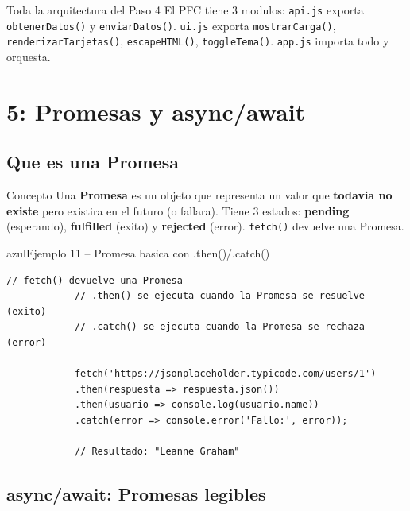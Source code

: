 \documentclass[11pt,a4paper]{article}
\begin{document}
	\begin{cajapractica}{Toda la arquitectura del Paso 4}
		El PFC tiene 3 modulos: \texttt{api.js} exporta \texttt{obtenerDatos()} y \texttt{enviarDatos()}. \texttt{ui.js} exporta \texttt{mostrarCarga()}, \texttt{renderizarTarjetas()}, \texttt{escapeHTML()}, \texttt{toggleTema()}. \texttt{app.js} importa todo y orquesta.
	\end{cajapractica}
	
	\section{5: Promesas y async/await}
	
	\subsection{Que es una Promesa}
	
	\begin{cajaconcepto}{Concepto}
		Una \textbf{Promesa} es un objeto que representa un valor que \textbf{todavia no existe} pero existira en el futuro (o fallara). Tiene 3 estados: \textbf{pending} (esperando), \textbf{fulfilled} (exito) y \textbf{rejected} (error). \texttt{fetch()} devuelve una Promesa.
	\end{cajaconcepto}
	
	\begin{cajacodigo}{azul}{Ejemplo 11 -- Promesa basica con .then()/.catch()}
		\begin{lstlisting}[style=codejs]
			// fetch() devuelve una Promesa
			// .then() se ejecuta cuando la Promesa se resuelve (exito)
			// .catch() se ejecuta cuando la Promesa se rechaza (error)
			
			fetch('https://jsonplaceholder.typicode.com/users/1')
			.then(respuesta => respuesta.json())
			.then(usuario => console.log(usuario.name))
			.catch(error => console.error('Fallo:', error));
			
			// Resultado: "Leanne Graham"
		\end{lstlisting}
	\end{cajacodigo}
	
	\subsection{async/await: Promesas legibles}
	
\end{document}
